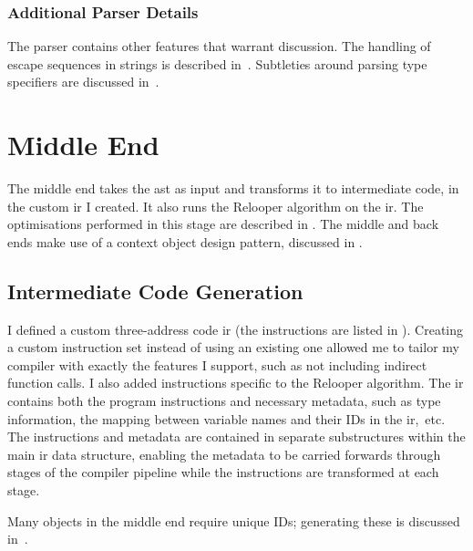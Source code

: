 \documentclass[00-main.tex]{subfiles}
\begin{document}
\subsubsection{Additional Parser Details}

The parser contains other features that warrant discussion.
The handling of escape sequences in strings is described in~.
Subtleties around parsing type specifiers are discussed in~.

\section{Middle End}\label{sec:impl:middle end}

The middle end takes the \gls{ast} as input and transforms it to intermediate code, in the custom \gls{ir} I created.
It also runs the Relooper algorithm on the \gls{ir}.
The optimisations performed in this stage are described in .
The middle and back ends make use of a context object design pattern, discussed in .

\subsection{Intermediate Code Generation}

I defined a custom three-address code \gls{ir} (the instructions are listed in ).
Creating a custom instruction set instead of using an existing one allowed me to tailor my compiler with exactly the features I support, such as not including indirect function calls.
I also added instructions specific to the Relooper algorithm.
The \gls{ir} contains both the program instructions and necessary metadata, such as type information, the mapping between variable names and their IDs in the \gls{ir},~etc.
The instructions and metadata are contained in separate substructures within the main \gls{ir} data structure, enabling the metadata to be carried forwards through stages of the compiler pipeline while the instructions are transformed at each stage.

Many objects in the middle end require unique IDs; generating these is discussed in~.
\end{document}
